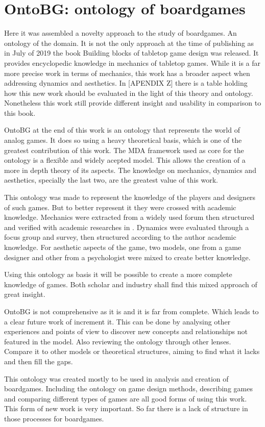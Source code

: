 \section{OntoBG: ontology of boardgames}

Here it was assembled a novelty approach to the study of boardgames. An ontology of the domain. It is not the only approach at the time of publishing as in July of 2019 the book Building blocks of tabletop game design \cite{engelstein2019building} was released. It provides encyclopedic knowledge in mechanics of tabletop games. While it is a far more precise work in terms of mechanics, this work has a broader aspect when addressing dynamics and aesthetics. In [APENDIX Z] there is a table holding how this new work should be evaluated in the light of this theory and ontology. Nonetheless this work still provide different insight and usability in comparison to this book.

OntoBG at the end of this work is an ontology that represents the world of analog games. It does so using a heavy theoretical basis, which is one of the greatest contribution of this work. The MDA framework used as core for the ontology is a flexible and widely acepted model. This allows the creation of a more in depth theory of its aspects. The knowledge on mechanics, dynamics and aesthetics, specially the last two, are the greatest value of this work. 

This ontology was made to represent the knowledge of the players and designers of such games. But to better represent it they were crossed with academic knowledge. Mechanics were extracted from a widely used forum then structured and verified with academic researches in \cite{kritz_buildingOntology}. Dynamics were evaluated through a focus group and survey, then structured according to the author academic knowledge. For aesthetic aspects of the game, two models, one from a game designer and other from a psychologist were mixed to create better knowledge.

Using this ontology as basis it will be possible to create a more complete knowledge of games. Both scholar and industry shall find this mixed approach of great insight.

OntoBG is not comprehensive as it is and it is far from complete. Which leads to a clear future work of increment it. This can be done by analysing other experiences and points of view to discover new concepts and relationships not featured in the model. Also reviewing the ontology through other lenses. Compare it to other models or theoretical structures, aiming to find what it lacks and then fill the gaps.

This ontology was created mostly to be used in analysis and creation of boardgames. Including the ontology on game design methods, describing games and comparing different types of games are all good forms of using this work. This form of new work is very important. So far there is a lack of structure in those processes for boardgames.

